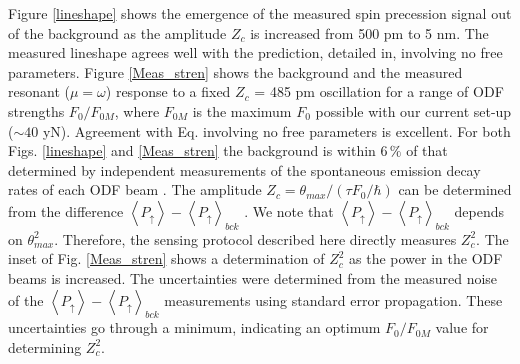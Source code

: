 \documentclass[aps,prl,twocolumn,superscriptaddress,floatfix]{revtex4-1}
\begin{document}
Figure \ref{lineshape} shows the emergence of the measured spin precession signal out of the background as the amplitude $Z_c$ is increased from 500 pm to 5 nm. The measured lineshape agrees well with the prediction, detailed in, involving no free parameters. Figure \ref{Meas_stren} shows the background and the measured resonant ($\mu=\omega$) response to a fixed $Z_c$ = 485 pm oscillation for a range of ODF strengths $F_{0}/F_{0M}$, where $F_{0M}$ is the maximum $F_0$ possible with our current set-up ($\sim 40$ yN). Agreement with Eq.  involving no free parameters is excellent. For both Figs. \ref{lineshape} and \ref{Meas_stren} the background is within $6\,\%$ of that determined by independent measurements of the spontaneous emission decay rates of each ODF beam . The amplitude $Z_c=\theta_{max}/(\tau F_{0}/\hbar)$ can be determined from the difference $\left< P_\uparrow \right>- \left< P_\uparrow \right>_{bck}$ . We note that $\left< P_\uparrow \right>- \left< P_\uparrow \right>_{bck}$ depends on $\theta_{max}^2$. Therefore, the sensing protocol described here directly measures $Z_c^2$. The inset of Fig. \ref{Meas_stren} shows a determination of $Z_c^2$ as the power in the ODF beams is increased. The uncertainties were determined from the measured noise of the $\left< P_\uparrow \right>- \left< P_\uparrow \right>_{bck}$ measurements using standard error propagation. These uncertainties go through a minimum, indicating an optimum $F_{0}/F_{0M}$ value for determining $Z_c^2$.
\end{document}
